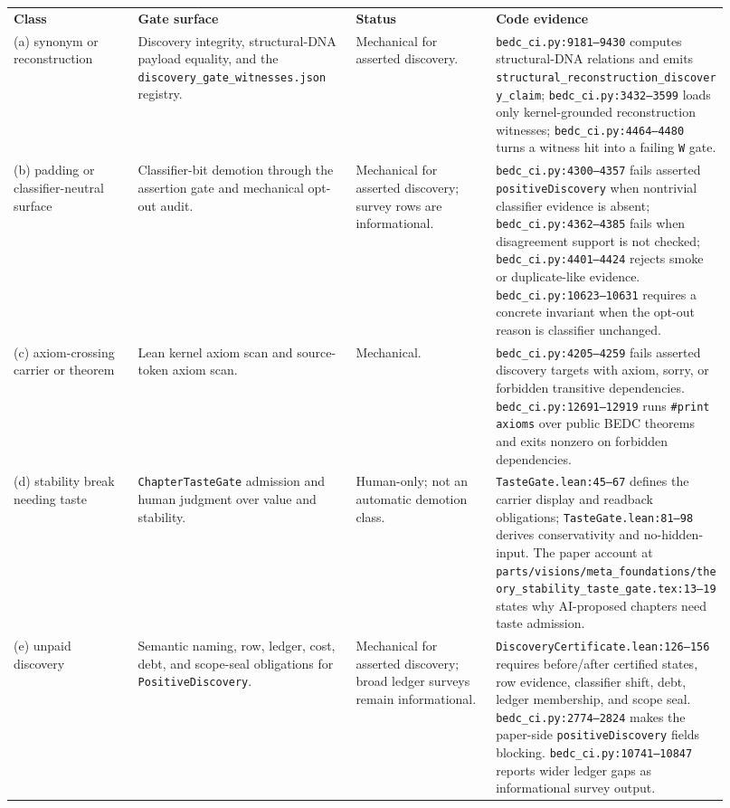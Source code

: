 \begin{center}
\begin{tabular}{p{0.16\linewidth}p{0.28\linewidth}p{0.18\linewidth}p{0.30\linewidth}}
\textbf{Class} & \textbf{Gate surface} & \textbf{Status} & \textbf{Code evidence} \\
(a) synonym or reconstruction &
Discovery integrity, structural-DNA payload equality, and the
\texttt{discovery\_gate\_witnesses.json} registry. &
Mechanical for asserted discovery. &
\texttt{bedc\_ci.py:9181--9430} computes structural-DNA relations and emits
\texttt{structural\_reconstruction\_discovery\_claim}; \texttt{bedc\_ci.py:3432--3599}
loads only kernel-grounded reconstruction witnesses; \texttt{bedc\_ci.py:4464--4480}
turns a witness hit into a failing \texttt{W} gate. \\
(b) padding or classifier-neutral surface &
Classifier-bit demotion through the assertion gate and mechanical opt-out
audit. &
Mechanical for asserted discovery; survey rows are informational. &
\texttt{bedc\_ci.py:4300--4357} fails asserted \texttt{positiveDiscovery} when
nontrivial classifier evidence is absent; \texttt{bedc\_ci.py:4362--4385} fails
when disagreement support is not checked; \texttt{bedc\_ci.py:4401--4424}
rejects smoke or duplicate-like evidence.  \texttt{bedc\_ci.py:10623--10631}
requires a concrete invariant when the opt-out reason is classifier unchanged. \\
(c) axiom-crossing carrier or theorem &
Lean kernel axiom scan and source-token axiom scan. &
Mechanical. &
\texttt{bedc\_ci.py:4205--4259} fails asserted discovery targets with axiom,
sorry, or forbidden transitive dependencies.  \texttt{bedc\_ci.py:12691--12919}
runs \texttt{\#print axioms} over public BEDC theorems and exits nonzero on
forbidden dependencies. \\
(d) stability break needing taste &
\texttt{ChapterTasteGate} admission and human judgment over value and stability. &
Human-only; not an automatic demotion class. &
\texttt{TasteGate.lean:45--67} defines the carrier display and readback
obligations; \texttt{TasteGate.lean:81--98} derives conservativity and
no-hidden-input.  The paper account at
\texttt{parts/visions/meta\_foundations/theory\_stability\_taste\_gate.tex:13--19} states why AI-proposed
chapters need taste admission. \\
(e) unpaid discovery &
Semantic naming, row, ledger, cost, debt, and scope-seal obligations for
\texttt{PositiveDiscovery}. &
Mechanical for asserted discovery; broad ledger surveys remain informational. &
\texttt{DiscoveryCertificate.lean:126--156} requires before/after certified
states, row evidence, classifier shift, debt, ledger membership, and scope seal.
\texttt{bedc\_ci.py:2774--2824} makes the paper-side \texttt{positiveDiscovery}
fields blocking.  \texttt{bedc\_ci.py:10741--10847} reports wider ledger gaps as
informational survey output. \\
\end{tabular}
\end{center}

